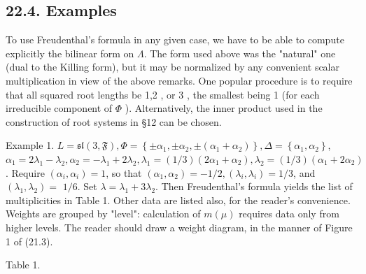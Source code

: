 \documentclass[10pt]{article}
\begin{document}
\subsection*{22.4. Examples}
To use Freudenthal's formula in any given case, we have to be able to compute explicitly the bilinear form on $\Lambda$. The form used above was the "natural" one (dual to the Killing form), but it may be normalized by any convenient scalar multiplication in view of the above remarks. One popular procedure is to require that all squared root lengths be 1,2 , or 3 , the smallest being 1 (for each irreducible component of $\Phi$ ). Alternatively, the inner product used in the construction of root systems in §12 can be chosen.

Example 1. $L=\mathfrak{s l}(3, \mathfrak{F}), \Phi=\left\{ \pm \alpha_{1}, \pm \alpha_{2}, \pm\left(\alpha_{1}+\alpha_{2}\right)\right\}, \Delta=\left\{\alpha_{1}, \alpha_{2}\right\}$, $\alpha_{1}=2 \lambda_{1}-\lambda_{2}, \alpha_{2}=-\lambda_{1}+2 \lambda_{2}, \lambda_{1}=(1 / 3)\left(2 \alpha_{1}+\alpha_{2}\right), \lambda_{2}=(1 / 3)\left(\alpha_{1}+2 \alpha_{2}\right)$. Require $\left(\alpha_{i}, \alpha_{i}\right)=1$, so that $\left(\alpha_{1}, \alpha_{2}\right)=-1 / 2,\left(\lambda_{i}, \lambda_{i}\right)=1 / 3$, and $\left(\lambda_{1}, \lambda_{2}\right)=$ $1 / 6$. Set $\lambda=\lambda_{1}+3 \lambda_{2}$. Then Freudenthal's formula yields the list of multiplicities in Table 1. Other data are listed also, for the reader's convenience. Weights are grouped by "level": calculation of $m(\mu)$ requires data only from higher levels. The reader should draw a weight diagram, in the manner of Figure 1 of (21.3).

Table 1.
\end{document}
